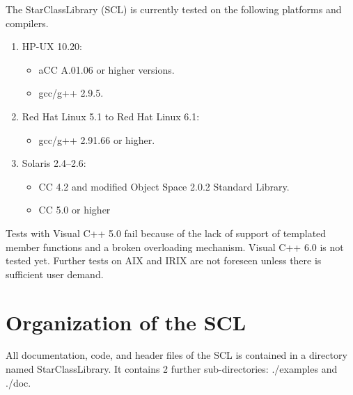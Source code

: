 \documentclass[twoside]{article}
\newcommand{\name}[1]{\textsf{#1}}%
\begin{document}
The \name{StarClassLibrary} (SCL)  is currently tested on the
following platforms and compilers.
\begin{enumerate}
\item HP-UX 10.20: 
  \begin{itemize}
    \item aCC A.01.06 or higher versions. 
    \item gcc/g++ 2.9.5.
  \end{itemize}
\item Red Hat Linux 5.1 to Red Hat Linux 6.1: 
  \begin{itemize}
    \item gcc/g++ 2.91.66 or higher. 
  \end{itemize}
\item Solaris 2.4--2.6: 
  \begin{itemize}
    \item CC 4.2 and modified Object Space 2.0.2 Standard Library. 
    \item CC 5.0 or higher
  \end{itemize}
\end{enumerate}
Tests with Visual C++ 5.0 fail because of the lack of support of 
templated member functions and a broken overloading mechanism. Visual C++ 6.0 is not
tested yet.
Further tests on AIX and IRIX are not foreseen unless there is sufficient user demand.
 

\section{Organization of the SCL}

All documentation, code, and header files of the SCL is contained in a
directory named \name{StarClassLibrary}.
It contains 2 further sub-directories:
\name{./examples} and \name{./doc}.
\end{document}
